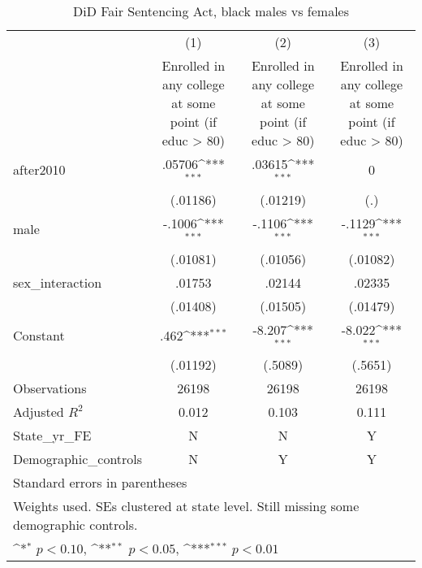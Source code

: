 \begin{table}[htbp]\centering
\def\sym#1{\ifmmode^{#1}\else\(^{#1}\)\fi}
\caption{DiD Fair Sentencing Act, black males vs females}
\begin{tabular}{l*{3}{c}}
\hline\hline
                    &\multicolumn{1}{c}{(1)}&\multicolumn{1}{c}{(2)}&\multicolumn{1}{c}{(3)}\\
                    &\multicolumn{1}{c}{Enrolled in any college at some point (if educ > 80)}&\multicolumn{1}{c}{Enrolled in any college at some point (if educ > 80)}&\multicolumn{1}{c}{Enrolled in any college at some point (if educ > 80)}\\
\hline
after2010           &      .05706\sym{***}&      .03615\sym{***}&           0         \\
                    &    (.01186)         &    (.01219)         &         (.)         \\
[1em]
male                &      -.1006\sym{***}&      -.1106\sym{***}&      -.1129\sym{***}\\
                    &    (.01081)         &    (.01056)         &    (.01082)         \\
[1em]
sex\_interaction     &      .01753         &      .02144         &      .02335         \\
                    &    (.01408)         &    (.01505)         &    (.01479)         \\
[1em]
Constant            &        .462\sym{***}&      -8.207\sym{***}&      -8.022\sym{***}\\
                    &    (.01192)         &     (.5089)         &     (.5651)         \\
\hline
Observations        &       26198         &       26198         &       26198         \\
Adjusted \(R^{2}\)  &       0.012         &       0.103         &       0.111         \\
State\_yr\_FE         &           N         &           N         &           Y         \\
Demographic\_controls&           N         &           Y         &           Y         \\
\hline\hline
\multicolumn{4}{l}{\footnotesize Standard errors in parentheses}\\
\multicolumn{4}{l}{\footnotesize Weights used. SEs clustered at state level. Still missing some demographic controls.}\\
\multicolumn{4}{l}{\footnotesize \sym{*} \(p<0.10\), \sym{**} \(p<0.05\), \sym{***} \(p<0.01\)}\\
\end{tabular}
\end{table}
